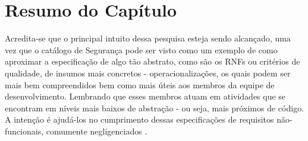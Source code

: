 \section{Resumo do Capítulo}

Acredita-se que o principal intuito dessa pesquisa esteja sendo alcançado, uma vez que o catálogo de Segurança pode ser visto como um exemplo de como aproximar a especificação de algo tão abstrato, como são os RNFs ou critérios de qualidade, de insumos mais concretos - operacionalizações, os quais podem ser mais bem compreendidos bem como mais úteis aos membros da equipe de desenvolvimento. Lembrando que esses membros atuam em atividades que se encontram em níveis mais baixos de abstração - ou seja, mais próximos de código. A intenção é ajudá-los no cumprimento dessas especificações de requisitos não-funcionais, comumente negligenciados \cite{eckhardt2016non}.